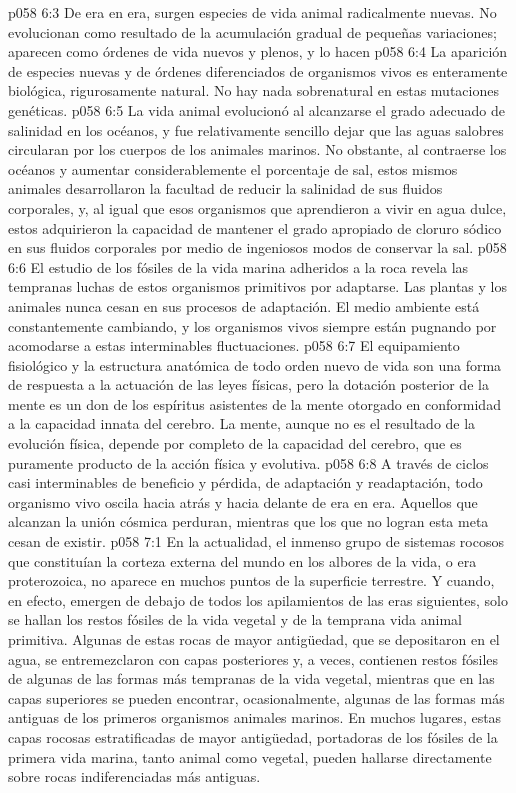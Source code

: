 \vs p058 6:3 De era en era, surgen especies de vida animal radicalmente nuevas. No evolucionan como resultado de la acumulación gradual de pequeñas variaciones; aparecen como órdenes de vida nuevos y plenos, y lo hacen 
\vs p058 6:4 La aparición  de especies nuevas y de órdenes diferenciados de organismos vivos es enteramente biológica, rigurosamente natural. No hay nada sobrenatural en estas mutaciones genéticas.
\vs p058 6:5 La vida animal evolucionó al alcanzarse el grado adecuado de salinidad en los océanos, y fue relativamente sencillo dejar que las aguas salobres circularan por los cuerpos de los animales marinos. No obstante, al contraerse los océanos y aumentar considerablemente el porcentaje de sal, estos mismos animales desarrollaron la facultad de reducir la salinidad de sus fluidos corporales, y, al igual que esos organismos que aprendieron a vivir en agua dulce, estos adquirieron la capacidad de mantener el grado apropiado de cloruro sódico en sus fluidos corporales por medio de ingeniosos modos de conservar la sal.
\vs p058 6:6 El estudio de los fósiles de la vida marina adheridos a la roca revela las tempranas luchas de estos organismos primitivos por adaptarse. Las plantas y los animales nunca cesan en sus procesos de adaptación. El medio ambiente está constantemente cambiando, y los organismos vivos siempre están pugnando por acomodarse a estas interminables fluctuaciones.
\vs p058 6:7 El equipamiento fisiológico y la estructura anatómica de todo orden nuevo de vida son una forma de respuesta a la actuación de las leyes físicas, pero la dotación posterior de la mente es un don de los espíritus asistentes de la mente otorgado en conformidad a la capacidad innata del cerebro. La mente, aunque no es el resultado de la evolución física, depende por completo de la capacidad del cerebro, que es puramente producto de la acción física y evolutiva.
\vs p058 6:8 A través de ciclos casi interminables de beneficio y pérdida, de adaptación y readaptación, todo organismo vivo oscila hacia atrás y hacia delante de era en era. Aquellos que alcanzan la unión cósmica perduran, mientras que los que no logran esta meta cesan de existir.
\vs p058 7:1 En la actualidad, el inmenso grupo de sistemas rocosos que constituían la corteza externa del mundo en los albores de la vida, o era proterozoica, no aparece en muchos puntos de la superficie terrestre. Y cuando, en efecto, emergen de debajo de todos los apilamientos de las eras siguientes, solo se hallan los restos fósiles de la vida vegetal y de la temprana vida animal primitiva. Algunas de estas rocas de mayor antigüedad, que se depositaron en el agua, se entremezclaron con capas posteriores y, a veces, contienen restos fósiles de algunas de las formas más tempranas de la vida vegetal, mientras que en las capas superiores se pueden encontrar, ocasionalmente, algunas de las formas más antiguas de los primeros organismos animales marinos. En muchos lugares, estas capas rocosas estratificadas de mayor antigüedad, portadoras de los fósiles de la primera vida marina, tanto animal como vegetal, pueden hallarse directamente sobre rocas indiferenciadas más antiguas.
